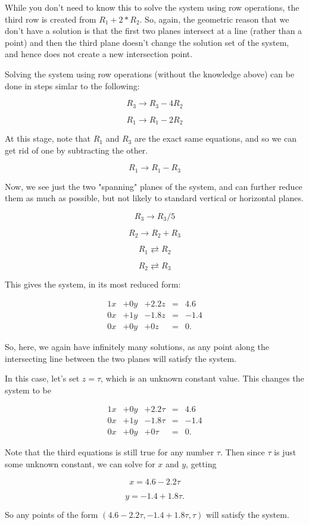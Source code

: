 \documentclass{ximera}
\begin{document}
    \begin{solution}

        While you don't need to know this to solve the system using row operations, the third row is created from $R_1+2*R_2$. So, again, the geometric reason that we don't have a solution is that the first two planes intersect at a line (rather than a point) and then the third plane doesn't change the solution set of the system, and hence does not create a new intersection point.

        Solving the system using row operations (without the knowledge above) can be done in steps simlar to the following:

        $$R_3\rightarrow R_3-4R_2$$

        $$R_1\rightarrow R_1-2R_2$$

        At this stage, note that $R_1$ and $R_3$ are the exact same equations, and so we can get rid of one by subtracting the other.

        $$R_1\rightarrow R_1-R_3$$

        Now, we see just the two "spanning" planes of the system, and can further reduce them as much as possible, but not likely to standard vertical or horizontal planes.

        $$R_3\rightarrow R_3/5$$

        $$R_2\rightarrow R_2+R_3$$

        $$R_1\rightleftarrows R_2$$

        $$R_2\rightleftarrows R_3$$

        This gives the system, in its most reduced form:

        $$\begin{array}{ccccccc}
            1x& +0y&+2.2z &=&4.6 \\
            0x&+1y& -1.8z& =&-1.4\\
            0x &+0y &+0z &=&0.
        \end{array}$$

        So, here, we again have infinitely many solutions, as any point along the intersecting line between the two planes will satisfy the system.

        In this case, let's set $z=\tau$, which is an unknown constant value. This changes the system to be 

        $$\begin{array}{ccccccc}
            1x& +0y&+2.2\tau &=&4.6 \\
            0x&+1y& -1.8\tau& =&-1.4\\
            0x &+0y &+0\tau &=&0.
        \end{array}$$

        Note that the third equations is still true for any number $\tau$. Then since $\tau$ is just some unknown constant, we can solve for $x$ and $y$, getting

        $$x=4.6-2.2\tau$$
        
        $$y=-1.4+1.8\tau.$$

        So any points of the form $(4.6-2.2\tau, -1.4+1.8\tau, \tau)$ will satisfy the system.

    \end{solution}
\end{document}
